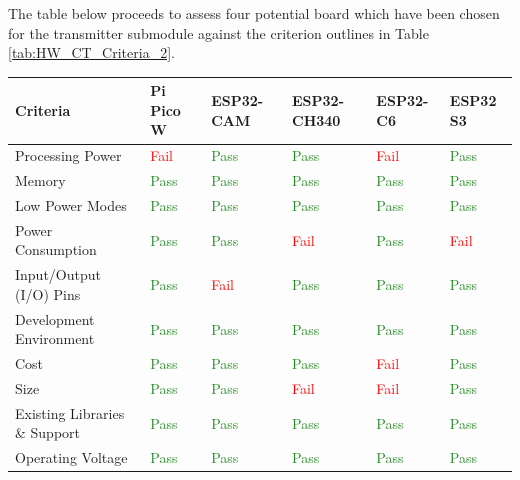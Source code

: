 \documentclass[class=report,11pt,crop=false]{standalone}
\begin{document}
The table below proceeds to assess four potential board which have been chosen for the transmitter submodule against the criterion outlines in Table \ref{tab:HW_CT_Criteria_2}.

\begin{table}[h]
\centering
\begin{tabular}{|p{3.5cm}|l|l|l|l|l|}
\hline
\textbf{Criteria} & \textbf{Pi Pico W} & \textbf{ESP32-CAM} & \textbf{ESP32-CH340} & \textbf{ESP32-C6} & \textbf{ESP32 S3} \\
\hline
Processing Power & \textcolor{red}{Fail} & \textcolor{ForestGreen}{Pass} & \textcolor{ForestGreen}{Pass} & \textcolor{red}{Fail} & \textcolor{ForestGreen}{Pass} \\
\hline
Memory & \textcolor{ForestGreen}{Pass} & \textcolor{ForestGreen}{Pass} & \textcolor{ForestGreen}{Pass} & \textcolor{ForestGreen}{Pass} & \textcolor{ForestGreen}{Pass} \\
\hline
Low Power Modes & \textcolor{ForestGreen}{Pass} & \textcolor{ForestGreen}{Pass} & \textcolor{ForestGreen}{Pass} & \textcolor{ForestGreen}{Pass} & \textcolor{ForestGreen}{Pass} \\
\hline
Power Consumption & \textcolor{ForestGreen}{Pass} & \textcolor{ForestGreen}{Pass} & \textcolor{red}{Fail} & \textcolor{ForestGreen}{Pass} & \textcolor{red}{Fail} \\
\hline
Input/Output (I/O) Pins & \textcolor{ForestGreen}{Pass} & \textcolor{red}{Fail} & \textcolor{ForestGreen}{Pass} & \textcolor{ForestGreen}{Pass} & \textcolor{ForestGreen}{Pass} \\
\hline
Development Environment & \textcolor{ForestGreen}{Pass} & \textcolor{ForestGreen}{Pass} & \textcolor{ForestGreen}{Pass} & \textcolor{ForestGreen}{Pass} & \textcolor{ForestGreen}{Pass} \\
\hline
Cost & \textcolor{ForestGreen}{Pass} & \textcolor{ForestGreen}{Pass} & \textcolor{ForestGreen}{Pass} & \textcolor{red}{Fail} & \textcolor{ForestGreen}{Pass} \\
\hline
Size & \textcolor{ForestGreen}{Pass} & \textcolor{ForestGreen}{Pass} & \textcolor{red}{Fail} & \textcolor{red}{Fail} & \textcolor{ForestGreen}{Pass} \\
\hline
Existing Libraries \& Support & \textcolor{ForestGreen}{Pass} & \textcolor{ForestGreen}{Pass} & \textcolor{ForestGreen}{Pass} & \textcolor{ForestGreen}{Pass} & \textcolor{ForestGreen}{Pass} \\
\hline
Operating Voltage & \textcolor{ForestGreen}{Pass} & \textcolor{ForestGreen}{Pass} & \textcolor{ForestGreen}{Pass} & \textcolor{ForestGreen}{Pass} & \textcolor{ForestGreen}{Pass} \\

\end{tabular}
\end{table}
\end{document}
